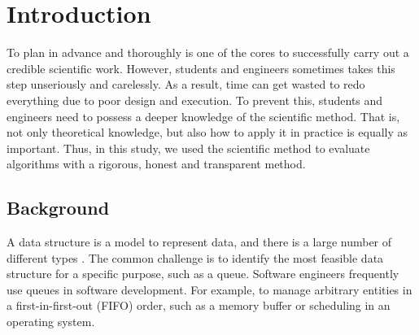 \documentclass[a4paper,11pt]{kth-mag}
\begin{document}

\chapter{Introduction}
To plan in advance and thoroughly is one of the cores to successfully carry out a credible scientific work.
However, students and engineers sometimes takes this step unseriously and carelessly.
As a result, time can get wasted to redo everything due to poor design and execution.
To prevent this, students and engineers need to possess a deeper knowledge of the scientific method.
That is, not only theoretical knowledge, but also how to apply it in practice is equally as important.
Thus, in this study, we used the scientific method to evaluate algorithms with a rigorous, honest and transparent method.

\section{Background}
A data structure is a model to represent data, and there is a large number of different types \cite{deshpande2004c}.
The common challenge is to identify the most feasible data structure for a specific purpose, such as a queue.
Software engineers frequently use queues in software development.
For example, to manage arbitrary entities in a first-in-first-out (FIFO) order, such as a memory buffer or scheduling in an operating system.
\end{document}
